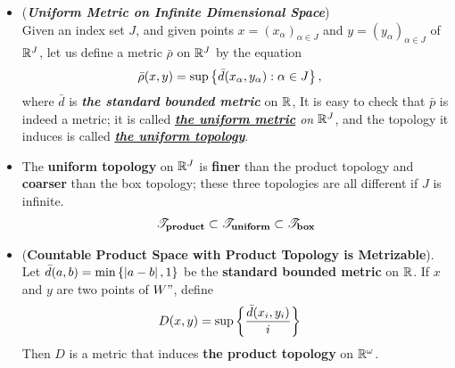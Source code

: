 \documentclass[11pt]{article}
\begin{document}
\begin{itemize}
\item \begin{definition}(\emph{\textbf{Uniform Metric on Infinite Dimensional Space}})\\
Given an index set $J$, and given points $x = (x_{\alpha})_{\alpha \in J}$ and $y = (y_{\alpha})_{\alpha \in J}$ of ${\mathbb R}^{J}$, let us define a metric $\bar{\rho}$ on ${\mathbb R}^{J}$ by the equation
\begin{align*}
\bar{\rho}(x, y) &= \sup\left\{\bar{d}(x_{\alpha}, y_{\alpha}): \alpha \in J\right\},
\end{align*}
where $\bar{d}$ is \emph{\textbf{the standard bounded metric}} on ${\mathbb R}$, It is easy to check that $\bar{p}$ is indeed a metric; it is called \emph{\underline{\textbf{the uniform metric}} on ${\mathbb R}^{J}$}, and the topology it induces is called \underline{\emph{\textbf{the uniform topology}}}.
\end{definition}

\item \begin{proposition}
The \textbf{uniform topology} on ${\mathbb R}^{J}$ is \textbf{finer} than the product topology and \textbf{coarser} than the box topology; these three topologies are all different if $J$ is infinite.
\begin{align*}
{\mathscr T}_{\textbf{product}} \subset {\mathscr T}_{\textbf{uniform}} \subset {\mathscr T}_{\textbf{box}}
\end{align*}
\end{proposition}

\item \begin{theorem} (\textbf{Countable Product Space with Product Topology is Metrizable}). \citep{munkres2000topology}\\
Let $\bar{d}(a, b) = \min\left\{\left\lvert a - b \right\rvert,  1\right\}$ be the \textbf{standard bounded metric} on ${\mathbb R}$. If $x$ and $y$ are two points of $W"$, define
\begin{align*}
D(x, y) &= \sup\left\{\frac{\bar{d}(x_i, y_i)}{i}\right\}
\end{align*}
Then $D$ is a metric that induces \textbf{the product topology} on ${\mathbb R}^{\omega}$.
\end{theorem}
\end{itemize}
\end{document}
